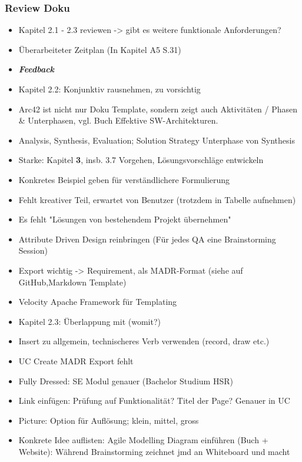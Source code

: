 \hypertarget{review-doku}{%
\subsubsection*{Review Doku}\label{review-doku}}

\begin{itemize}
\item
  Kapitel 2.1 - 2.3 reviewen -\textgreater{} gibt es weitere funktionale
  Anforderungen?
\item
  Überarbeiteter Zeitplan (In Kapitel A5 S.31) 
\item \emph{\textbf{Feedback}}
\item
  Kapitel 2.2: Konjunktiv rausnehmen, zu vorsichtig
\item
  Arc42 ist nicht nur Doku Template, sondern zeigt auch Aktivitäten /
  Phasen \& Unterphasen, vgl. Buch Effektive SW-Architekturen.
\item
  Analysis, Synthesis, Evaluation; Solution Strategy Unterphase von
  Synthesis
\item
  Starke: Kapitel \textbf{3}, insb. 3.7 Vorgehen, Lösungsvorschläge
  entwickeln
\item
  Konkretes Beispiel geben für verständlichere Formulierung
\item
  Fehlt kreativer Teil, erwartet von Benutzer (trotzdem in Tabelle
  aufnehmen)
\item
  Es fehlt "Lösungen von bestehendem Projekt übernehmen"
\item
  Attribute Driven Design reinbringen (Für jedes QA eine Brainstorming
  Session)
\item
  Export wichtig -\textgreater{} Requirement, als MADR-Format (siehe auf
  GitHub,Markdown Template)
\item
  Velocity Apache Framework für Templating
\item
  Kapitel 2.3: Überlappung mit (womit?)
\item
  Insert zu allgemein, technischeres Verb verwenden (record, draw etc.)
\item
  UC Create MADR Export fehlt
\item
  Fully Dressed: SE Modul genauer (Bachelor Studium HSR)
\item
  Link einfügen: Prüfung auf Funktionalität? Titel der Page? Genauer in
  UC
\item
  Picture: Option für Auflösung; klein, mittel, gross
\item
  Konkrete Idee auflisten: Agile Modelling Diagram einführen (Buch +
  Website): Während Brainstorming zeichnet jmd an Whiteboard und macht

\end{itemize}
